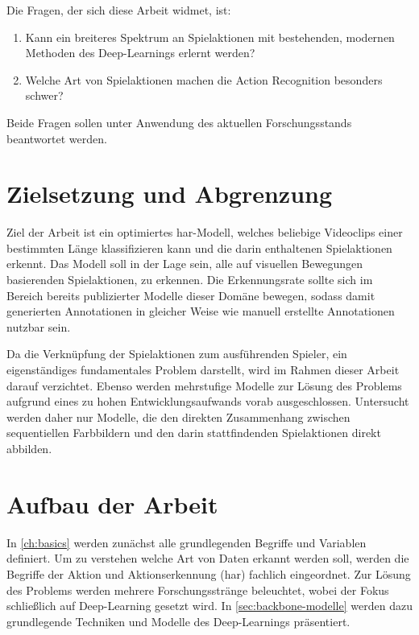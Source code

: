 Die Fragen, der sich diese Arbeit widmet, ist:
\begin{enumerate}
    \item Kann ein breiteres Spektrum an Spielaktionen mit bestehenden, modernen Methoden des Deep-Learnings erlernt werden?
    \item Welche Art von Spielaktionen machen die Action Recognition besonders schwer?
\end{enumerate}
Beide Fragen sollen unter Anwendung des aktuellen Forschungsstands beantwortet werden.

\section{Zielsetzung und Abgrenzung}
\label{sec:zielsetzung}

Ziel der Arbeit ist ein optimiertes \gls{har}-Modell, welches beliebige Videoclips einer bestimmten Länge klassifizieren kann und die darin enthaltenen Spielaktionen erkennt.
Das Modell soll in der Lage sein, alle auf visuellen Bewegungen basierenden Spielaktionen, zu erkennen.
Die Erkennungsrate sollte sich im Bereich bereits publizierter Modelle dieser Domäne bewegen, sodass damit generierten Annotationen in gleicher Weise wie manuell erstellte Annotationen nutzbar sein.

Da die Verknüpfung der Spielaktionen zum ausführenden Spieler, ein eigenständiges fundamentales Problem darstellt, wird im Rahmen dieser Arbeit darauf verzichtet.
Ebenso werden mehrstufige Modelle zur Lösung des Problems aufgrund eines zu hohen Entwicklungsaufwands vorab ausgeschlossen.
Untersucht werden daher nur Modelle, die den direkten Zusammenhang zwischen sequentiellen Farbbildern und den darin stattfindenden Spielaktionen direkt abbilden.

\section{Aufbau der Arbeit}
\label{sec:aufbau-der-arbeit}

In \autoref{ch:basics} werden zunächst alle grundlegenden Begriffe und Variablen definiert.
Um zu verstehen welche Art von Daten erkannt werden soll, werden die Begriffe der Aktion und Aktionserkennung (\gls{har}) fachlich eingeordnet.
Zur Lösung des Problems werden mehrere Forschungsstränge beleuchtet, wobei der Fokus schließlich auf Deep-Learning gesetzt wird.
In \autoref{sec:backbone-modelle} werden dazu grundlegende Techniken und Modelle des Deep-Learnings präsentiert.

